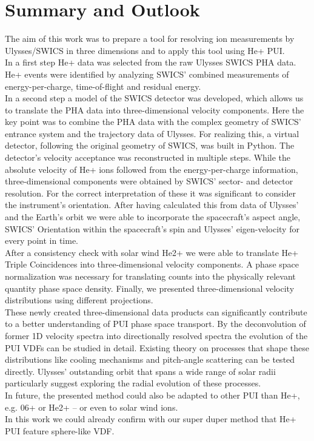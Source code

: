 
\chapter{Summary and Outlook} %

\label{chap:concl} %



The aim of this work was to prepare a tool for resolving ion measurements by Ulysses/SWICS in three dimensions and to apply this tool using He+ PUI.\\
In a first step He+ data was selected from the raw Ulysses SWICS PHA data.
He+ events were identified by analyzing SWICS' combined measurements of energy-per-charge, time-of-flight and residual energy.\\
In a second step a model of the SWICS detector was developed, which allows us to translate the PHA data into three-dimensional velocity components.
Here the key point was to combine the PHA data with the complex geometry of SWICS' entrance system and the trajectory data of Ulysses. For realizing this, a virtual detector, following the original geometry of SWICS, was built in Python. 
The detector's velocity acceptance was reconstructed in multiple steps. While the absolute velocity of He+ ions followed from the energy-per-charge information, three-dimensional components were obtained by SWICS' sector- and detector resolution. For the correct interpretation of these it was significant to consider the instrument's orientation. After having calculated this from data of Ulysses' and the Earth's orbit we were able to incorporate the spacecraft's aspect angle, SWICS' Orientation within the spacecraft's spin and Ulysses' eigen-velocity for every point in time.\\
After a consistency check with solar wind He2+ we were able to translate He+ Triple Coincidences into three-dimensional velocity components.
A phase space normalization was necessary for translating counts into the physically relevant quantity phase space density.
Finally, we presented three-dimensional velocity distributions using different projections. 
\\
These newly created three-dimensional data products can significantly contribute to a better understanding of PUI phase space transport. By the deconvolution of former 1D velocity spectra into directionally resolved spectra the evolution of the PUI VDFs can be studied in detail.
Existing theory on processes that shape these distributions like cooling mechanisms and pitch-angle scattering can be tested directly.
Ulysses' outstanding orbit that spans a wide range of solar radii particularly suggest exploring the radial evolution of these processes.\\
In future, the presented method could also be adapted to other PUI than He+, e.g. 06+ or He2+ -- or even to solar wind ions. \\
In this work we could already confirm with our super duper method that He+ PUI feature sphere-like VDF.



